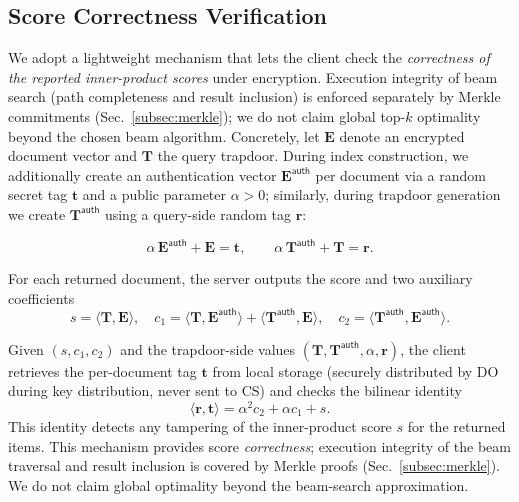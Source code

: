 \documentclass[journal]{IEEEtran}
\begin{document}
\subsection{Score Correctness Verification}

We adopt a lightweight mechanism that lets the client check the \emph{correctness of the reported inner-product scores} under encryption. Execution integrity of beam search (path completeness and result inclusion) is enforced separately by Merkle commitments (Sec.~\ref{subsec:merkle}); we do not claim global top-$k$ optimality beyond the chosen beam algorithm. Concretely, let $\mathbf{E}$ denote an encrypted document vector and $\mathbf{T}$ the query trapdoor. During index construction, we additionally create an authentication vector $\mathbf{E}^{\mathsf{auth}}$ per document via a random secret tag $\mathbf{t}$ and a public parameter $\alpha>0$; similarly, during trapdoor generation we create $\mathbf{T}^{\mathsf{auth}}$ using a query-side random tag $\mathbf{r}$:

\begin{equation}
\alpha\,\mathbf{E}^{\mathsf{auth}} + \mathbf{E} = \mathbf{t},\qquad \alpha\,\mathbf{T}^{\mathsf{auth}} + \mathbf{T} = \mathbf{r}.
\end{equation}

For each returned document, the server outputs the score and two auxiliary coefficients
\begin{equation}
 s=\langle \mathbf{T}, \mathbf{E}\rangle,\quad c_1=\langle \mathbf{T}, \mathbf{E}^{\mathsf{auth}}\rangle + \langle \mathbf{T}^{\mathsf{auth}}, \mathbf{E}\rangle,\quad c_2=\langle \mathbf{T}^{\mathsf{auth}}, \mathbf{E}^{\mathsf{auth}}\rangle.
\end{equation}

Given $(s,c_1,c_2)$ and the trapdoor-side values $(\mathbf{T},\mathbf{T}^{\mathsf{auth}},\alpha,\mathbf{r})$, the client retrieves the per-document tag $\mathbf{t}$ from local storage (securely distributed by DO during key distribution, never sent to CS) and checks the bilinear identity
\begin{equation}
 \langle \mathbf{r}, \mathbf{t}\rangle = \alpha^2 c_2 + \alpha c_1 + s.
\end{equation}
This identity detects any tampering of the inner-product score $s$ for the returned items. This mechanism provides score \emph{correctness}; execution integrity of the beam traversal and result inclusion is covered by Merkle proofs (Sec.~\ref{subsec:merkle}). We do not claim global optimality beyond the beam-search approximation.
\end{document}
